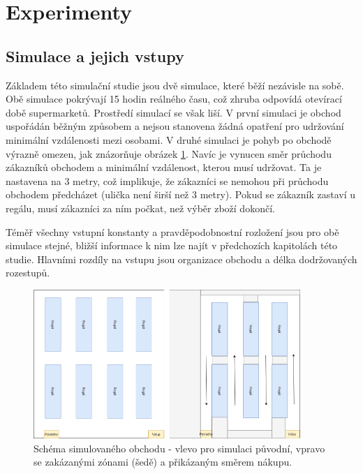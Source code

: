 \documentclass[11pt,a4paper]{article}
\begin{document}
\section{Experimenty}

\subsection{Simulace a jejich vstupy}

Základem této simulační studie jsou dvě simulace, které běží nezávisle na sobě. Obě simulace pokrývají 15 hodin reálného času, což zhruba odpovídá otevírací době supermarketů. Prostředí simulací se však liší. V první simulaci je obchod uspořádán běžným způsobem a nejsou stanovena žádná opatření pro udržování minimální vzdálenosti mezi osobami. V druhé simulaci je pohyb po obchodě výrazně omezen, jak znázorňuje obrázek \ref{twoshops}. Navíc je vynucen směr průchodu zákazníků obchodem a minimální vzdálenost, kterou musí udržovat. Ta je nastavena na 3 metry, což implikuje, že zákazníci se nemohou při průchodu obchodem předcházet (ulička není širší než 3 metry). Pokud se zákazník zastaví u regálu, musí zákazníci za ním počkat, než výběr zboží dokončí.

Téměř všechny vstupní konstanty a pravděpodobnostní rozložení jsou pro obě simulace stejné, bližší informace k nim lze najít v předchozích kapitolách této studie. Hlavními rozdíly na vstupu jsou organizace obchodu a délka dodržovaných rozestupů.

\begin{figure}[h!]
  \caption{Schéma simulovaného obchodu - vlevo pro simulaci původní, vpravo se zakázanými zónami (šedě) a přikázaným směrem nákupu.}
  \label{twoshops}
  \begin{center}
    \includegraphics[width=0.9\textwidth]{tescoscheme2.png}
    \end{center}
\end{figure}    
\end{document}

